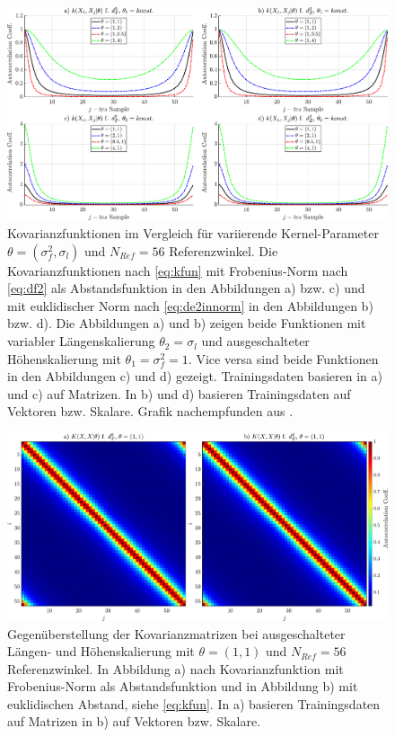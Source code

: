 \clearpage
\begin{figure}[tph]
\centering
\includegraphics[width=\linewidth]{chapters/images/4-EuOExp/Vergleich-Kovarianzfunktionen}
\caption[Kovarianzfunktionen im Vergleich]{Kovarianzfunktionen im Vergleich für variierende Kernel-Parameter $\theta = (\sigma_f^2, \sigma_l)$ und $N_{Ref} = 56$ Referenzwinkel. Die Kovarianzfunktionen nach \autoref{eq:kfun} mit Frobenius-Norm nach \autoref{eq:df2} als Abstandsfunktion in den Abbildungen a) bzw. c) und mit euklidischer Norm nach \autoref{eq:de2innorm} in den Abbildungen b) bzw. d). Die Abbildungen a) und b) zeigen beide Funktionen mit variabler Längenskalierung $\theta_2 = \sigma_l$ und ausgeschalteter Höhenskalierung mit $\theta_1 = \sigma_f^2 = 1$. Vice versa sind beide Funktionen in den Abbildungen c) und d) gezeigt. Trainingsdaten basieren in a) und c) auf Matrizen. In b) und d) basieren Trainingsdaten auf Vektoren bzw. Skalare. Grafik nachempfunden aus \cite{Lang2014}.}
\label{fig:vergleich-kovarianzfunktionen}
\end{figure}


\clearpage
\begin{figure}[tph]
\centering
\includegraphics[width=\linewidth]{chapters/images/4-EuOExp/Vergleich-Kovarianzmatrizen}
\caption[Gegenüberstellung der Kovarianzmatrizen]{Gegenüberstellung der Kovarianzmatrizen bei ausgeschalteter Längen- und Höhenskalierung mit $\theta = (1,1)$ und $N_{Ref} = 56$ Referenzwinkel. In Abbildung a) nach Kovarianzfunktion mit Frobenius-Norm als Abstandsfunktion und in Abbildung b) mit euklidischen Abstand, siehe \autoref{eq:kfun}. In a) basieren Trainingsdaten auf Matrizen in b) auf Vektoren bzw. Skalare.}
\label{fig:vergleich-kovarianzmatrizen}
\end{figure}


